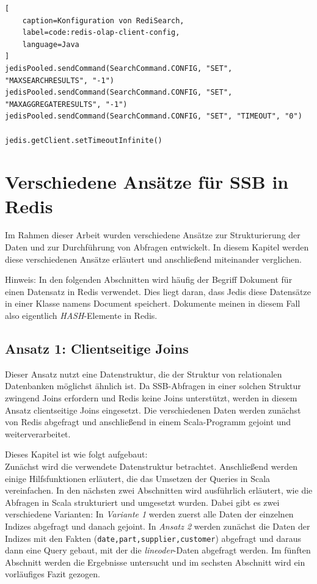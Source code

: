 \begin{lstlisting}[
    caption=Konfiguration von RediSearch,
    label=code:redis-olap-client-config,
    language=Java
]
jedisPooled.sendCommand(SearchCommand.CONFIG, "SET", "MAXSEARCHRESULTS", "-1")
jedisPooled.sendCommand(SearchCommand.CONFIG, "SET", "MAXAGGREGATERESULTS", "-1")
jedisPooled.sendCommand(SearchCommand.CONFIG, "SET", "TIMEOUT", "0")

jedis.getClient.setTimeoutInfinite()
\end{lstlisting}

\section{Verschiedene Ansätze für SSB in Redis}
Im Rahmen dieser Arbeit wurden verschiedene Ansätze zur Strukturierung der Daten und zur Durchführung von Abfragen entwickelt. In diesem Kapitel werden diese verschiedenen Ansätze erläutert und anschließend miteinander verglichen.

Hinweis: In den folgenden Abschnitten wird häufig der Begriff Dokument für einen Datensatz in Redis verwendet. Dies liegt daran, dass Jedis diese Datensätze in einer Klasse namens Document speichert. Dokumente meinen in diesem Fall also eigentlich \emph{HASH}-Elemente in Redis.

\subsection{Ansatz 1: Clientseitige Joins}
Dieser Ansatz nutzt eine Datenstruktur, die der Struktur von relationalen Datenbanken möglichst ähnlich ist. Da SSB-Abfragen in einer solchen Struktur zwingend Joins erfordern und Redis keine Joins unterstützt, werden in diesem Ansatz clientseitige Joins eingesetzt. Die verschiedenen Daten werden zunächst von Redis abgefragt und anschließend in einem Scala-Programm gejoint und weiterverarbeitet.

Dieses Kapitel ist wie folgt aufgebaut:\\
Zunächst wird die verwendete Datenstruktur betrachtet. Anschließend werden einige Hilfsfunktionen erläutert, die das Umsetzen der Queries in Scala vereinfachen.
In den nächsten zwei Abschnitten wird ausführlich erläutert, wie die Abfragen in Scala strukturiert und umgesetzt wurden. Dabei gibt es zwei verschiedene Varianten: In \emph{Variante 1} werden zuerst alle Daten der einzelnen Indizes abgefragt und danach gejoint. In \emph{Ansatz 2} werden zunächst die Daten der Indizes mit den Fakten (\lstinline|date,part,supplier,customer|) abgefragt und daraus dann eine Query gebaut, mit der die \emph{lineoder}-Daten abgefragt werden.
Im fünften Abschnitt werden die Ergebnisse untersucht und im sechsten Abschnitt wird ein vorläufiges Fazit gezogen.

